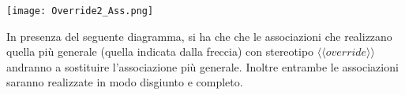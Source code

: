 
\begin{center}
  \texttt{[image: Override2\_Ass.png]}
\end{center}

\noindent
In presenza del seguente diagramma, si ha che che le associazioni che realizzano quella più generale (quella indicata dalla freccia) con stereotipo $\langle\langle override \rangle\rangle$ andranno a sostituire l'associazione più generale. Inoltre entrambe le associazioni saranno realizzate in modo disgiunto e completo.
